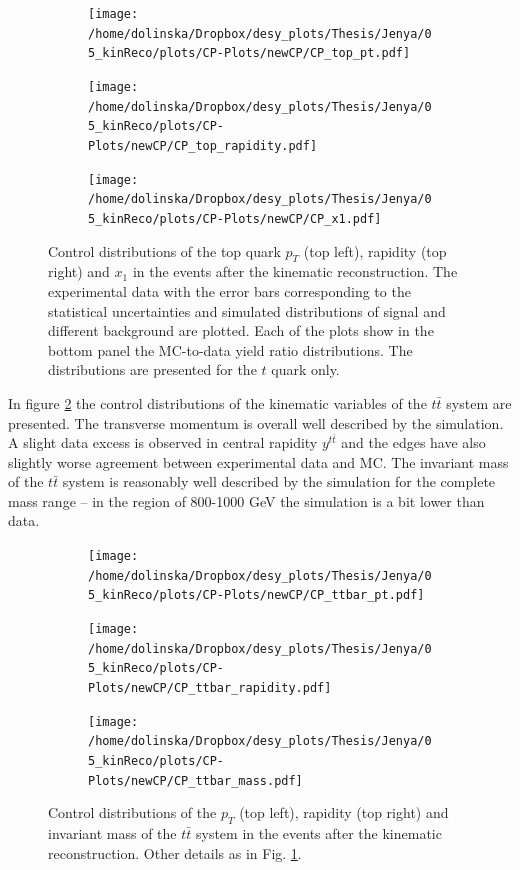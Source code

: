 \begin{figure}[h]
\centering
\begin{subfigure}
  \centering
  \texttt{[image: /home/dolinska/Dropbox/desy\_plots/Thesis/Jenya/05\_kinReco/plots/CP-Plots/newCP/CP\_top\_pt.pdf]}
\end{subfigure}
\begin{subfigure}
  \centering
  \texttt{[image: /home/dolinska/Dropbox/desy\_plots/Thesis/Jenya/05\_kinReco/plots/CP-Plots/newCP/CP\_top\_rapidity.pdf]}
\end{subfigure}
\begin{subfigure}
  \centering
  \texttt{[image: /home/dolinska/Dropbox/desy\_plots/Thesis/Jenya/05\_kinReco/plots/CP-Plots/newCP/CP\_x1.pdf]}
\end{subfigure}
\caption{Control distributions of the top quark $p_{T}$ (top left), rapidity (top right) and  $x_{1}$ in the events 
 after the kinematic reconstruction. The experimental data with the error bars corresponding to the statistical uncertainties
 and simulated distributions of signal and different background are plotted. Each of the plots show in the bottom panel the MC-to-data yield ratio distributions. 
 The distributions are presented for the $t$ quark only.}
\label{fig:CPkinTop}
\end{figure}

In figure \ref{fig:CPkinTTbar} the control distributions of the kinematic variables of the $t\bar{t}$ system are presented. The transverse momentum is overall
well described by the simulation. A slight data excess is observed in central rapidity $y^{t\bar{t}}$ and the edges have also slightly worse agreement between
experimental data and MC. The invariant mass of the $t\bar{t}$ system is reasonably well described by the simulation for the complete mass range -- in the region 
of 800-1000 GeV the simulation is a bit lower than data.

\begin{figure}[h]
\centering
\begin{subfigure}
  \centering
  \texttt{[image: /home/dolinska/Dropbox/desy\_plots/Thesis/Jenya/05\_kinReco/plots/CP-Plots/newCP/CP\_ttbar\_pt.pdf]}
\end{subfigure}
\begin{subfigure}
  \centering
  \texttt{[image: /home/dolinska/Dropbox/desy\_plots/Thesis/Jenya/05\_kinReco/plots/CP-Plots/newCP/CP\_ttbar\_rapidity.pdf]}
\end{subfigure}
\begin{subfigure}
  \centering
  \texttt{[image: /home/dolinska/Dropbox/desy\_plots/Thesis/Jenya/05\_kinReco/plots/CP-Plots/newCP/CP\_ttbar\_mass.pdf]}
\end{subfigure}
\caption{Control distributions of the $p_{T}$ (top left), rapidity (top right) and invariant mass of the $t\bar{t}$ system in the events 
 after the kinematic reconstruction. Other details as in Fig. \ref{fig:CPkinTop}.}
\label{fig:CPkinTTbar}
\end{figure}

